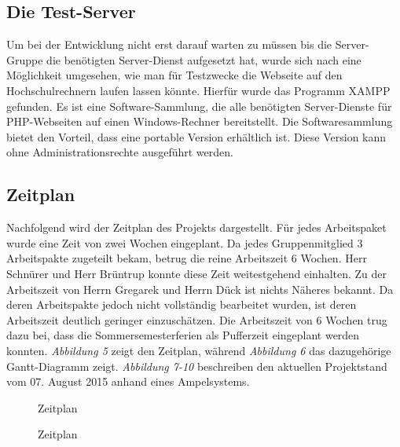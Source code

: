 \subsection{Die Test-Server}
Um bei der Entwicklung nicht erst darauf warten zu müssen bis die Server-Gruppe die benötigten Server-Dienst aufgesetzt hat, wurde sich nach eine Möglichkeit umgesehen, wie man für Testzwecke die Webseite auf den Hochschulrechnern laufen lassen könnte. Hierfür wurde das Programm XAMPP gefunden. Es ist eine Software-Sammlung, die alle benötigten Server-Dienste für PHP-Webseiten auf einen Windows-Rechner bereitstellt. Die Softwaresammlung bietet den Vorteil, dass eine portable Version erhältlich ist. Diese Version kann ohne Administrationsrechte ausgeführt werden.

\subsection{Zeitplan}
Nachfolgend wird der Zeitplan des Projekts dargestellt. Für jedes Arbeitspaket wurde eine Zeit von zwei Wochen eingeplant. Da jedes Gruppenmitglied 3 Arbeitspakte zugeteilt bekam, betrug die reine Arbeitszeit 6 Wochen. Herr Schnürer und Herr Brüntrup konnte diese Zeit weitestgehend einhalten. Zu der Arbeitszeit von Herrn Gregarek und Herrn Dück  ist nichts Näheres bekannt. Da deren Arbeitspakte jedoch nicht vollständig bearbeitet wurden, ist deren Arbeitszeit deutlich geringer einzuschätzen. Die Arbeitszeit von 6 Wochen trug dazu bei, dass die Sommersemesterferien als Pufferzeit eingeplant werden konnten. \textit{Abbildung 5} zeigt den Zeitplan, während \textit{Abbildung 6} das dazugehörige Gantt-Diagramm zeigt. \textit{Abbildung 7-10} beschreiben den aktuellen Projektstand vom 07. August 2015 anhand eines Ampelsystems. 

\begin{figure}[H] 
  \centering
  \caption{Zeitplan}
\end{figure}

\begin{figure}[H] 
  \centering
  \caption{Zeitplan}
\end{figure}

